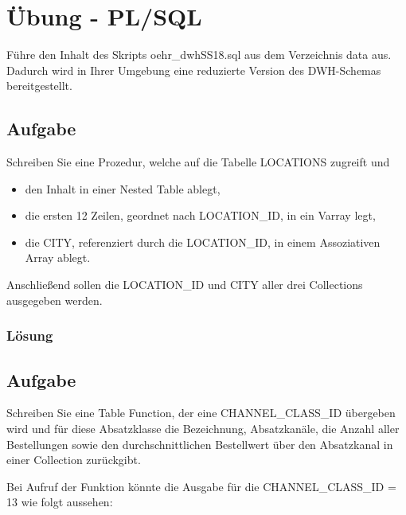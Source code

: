 \section{Übung - PL/SQL}
\label{sec:uebung_02}
Führe den Inhalt des Skripts oehr\_dwhSS18.sql aus dem Verzeichnis data aus. Dadurch wird in Ihrer Umgebung eine reduzierte Version des DWH-Schemas bereitgestellt.

\subsection{Aufgabe}
\label{sec:uebung_02.aufgabe_01}
Schreiben Sie eine Prozedur, welche auf die Tabelle LOCATIONS zugreift und
\begin{itemize}
  \item den Inhalt in einer Nested Table ablegt,
  \item die ersten 12 Zeilen, geordnet nach LOCATION\_ID, in ein Varray legt,
  \item die CITY, referenziert durch die LOCATION\_ID, in einem Assoziativen Array ablegt.
\end{itemize}
Anschließend sollen die LOCATION\_ID und CITY aller drei Collections ausgegeben werden.

\subsubsection*{Lösung}
\label{sec:uebung_02.aufgabe_01.loesung}


\subsection{Aufgabe}
\label{sec:uebung_02.aufgabe_02}
Schreiben Sie eine Table Function, der eine CHANNEL\_CLASS\_ID übergeben wird und für diese Absatzklasse die Bezeichnung, Absatzkanäle, die Anzahl aller Bestellungen sowie den durchschnittlichen Bestellwert über den Absatzkanal in einer Collection zurückgibt.

Bei Aufruf der Funktion könnte die Ausgabe für die CHANNEL\_CLASS\_ID = 13 wie folgt aussehen:


